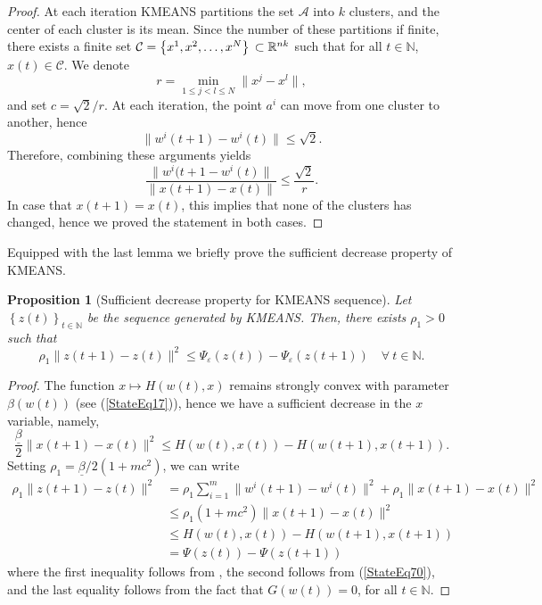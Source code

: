 \documentclass[12pt]{article}
\numberwithin{equation}{section}
\newtheorem{proposition}{Proposition}[section]
\begin{document}
\begin{proof}
At each iteration KMEANS partitions the set $\mathcal{A}$ into $k$ clusters, and the center of each cluster is its mean. Since the number of these partitions if finite, there exists a finite set $\mathcal{C} = \left\lbrace x^1,x^2, \ldots, x^N \right\rbrace\\ \subset \mathbb{R}^{nk}$ such that for all $t \in \mathbb{N}$, $x(t) \in \mathcal{C}$. We denote
\begin{equation*}
	r = \min\limits_{1 \leq j < l \leq N} \|x^j-x^l\|,
\end{equation*}
and set $c = \sqrt{2}/r$.
At each iteration, the point $a^i$ can move from one cluster to another, hence
\begin{equation*}
	\|w^i(t+1)-w^i(t)\| \leq \sqrt{2} .
\end{equation*}
Therefore, combining these arguments yields
\begin{equation*}
	\frac{\|w^i(t+1-w^i(t)\|}{\|x(t+1)-x(t)\|} \leq \frac{\sqrt{2}}{r} .
\end{equation*}
In case that $x(t+1)=x(t)$, this implies that none of the clusters has changed, hence we proved the statement in both cases.
\end{proof}

Equipped with the last lemma we briefly prove the sufficient decrease property of KMEANS.

\begin{proposition}[Sufficient decrease property for KMEANS sequence]
Let $\left\lbrace z(t) \right\rbrace_{t \in \mathbb{N}}$ be the sequence generated by KMEANS. Then, there exists $\rho_1 > 0$ such that 
\begin{equation*}
	\rho_1 \|z(t+1) - z(t)\|^2 \leq \Psi_{\varepsilon}(z(t)) - \Psi_{\varepsilon}(z(t+1)) \quad \forall \: t \in \mathbb{N} .
\end{equation*}
\end{proposition}

\begin{proof}
The function $x \mapsto H(w(t),x)$ remains strongly convex with parameter $\beta(w(t))$ (see (\ref{StateEq17})), hence we have a sufficient decrease in the $x$ variable, namely,
\begin{equation}
	\frac{\underline{\beta}}{2} \|x(t+1)-x(t)\|^2 \leq H(w(t),x(t)) - H(w(t+1),x(t+1)) . \label{StateEq70}
\end{equation}
Setting $\rho_1 = \underline{\beta} /2(1 + mc^2)$, we can write
\begin{align*}
	\rho_1 \|z(t+1)-z(t)\|^2 &= \rho_1 \sum\limits_{i=1}^{m} \|w^i(t+1)-w^i(t)\|^2 + \rho_1 \|x(t+1)-x(t)\|^2 \\
	&\leq \rho_1 (1 + mc^2) \|x(t+1) - x(t)\|^2 \\
	&\leq H(w(t),x(t)) - H(w(t+1),x(t+1)) \\
	&= \Psi(z(t)) - \Psi(z(t+1))
\end{align*}
where the first inequality follows from , the second follows from (\ref{StateEq70}), and the last equality follows from the fact that $G(w(t))=0$, for all $t \in \mathbb{N}$.
\end{proof}
\end{document}
